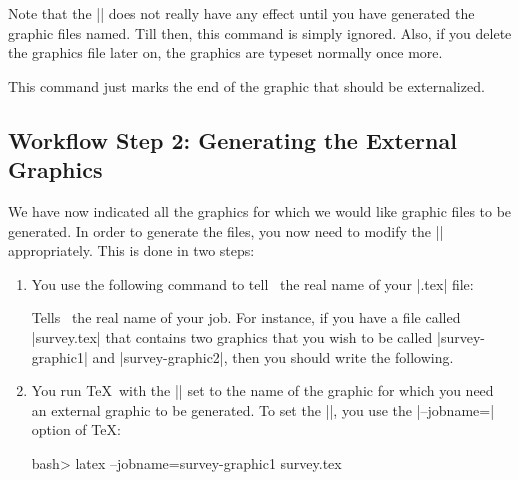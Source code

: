 \begin{command}{\beginpgfgraphicnamed{}}
  Note that the |\beginpgfgraphicnamed| does not really have any
  effect until you have generated the graphic files named. Till then,
  this command is simply ignored. Also, if you delete the graphics
  file later on, the graphics are typeset normally once more.
\end{command}

\begin{command}{\endpgfgraphicnamed}
  This command just marks the end of the graphic that should be
  externalized.
\end{command}


\subsection{Workflow Step 2: Generating the External Graphics}

We have now indicated all the graphics for which we would like graphic
files to be generated. In order to generate the files, you now need to
modify the |\jobname| appropriately. This is done in two steps:

\begin{enumerate}
\item You use the following command to tell \pgfname\ the real name of
  your |.tex| file:
  \begin{command}{\pgfrealjobname{}}
    Tells \pgfname\ the real name of your job. For instance, if you
    have a file called |survey.tex| that contains two graphics that
    you wish to be called |survey-graphic1| and |survey-graphic2|,
    then you should write the following.
  \end{command}
\item  You run \TeX\ with the |\jobname| set to the name of
the graphic for which you need an external graphic to be generated.
To set the |\jobname|, you use the |--jobname=| option of \TeX:

\begin{codeexample}[code only, tikz syntax=false]
bash> latex --jobname=survey-graphic1 survey.tex
\end{codeexample}
\end{enumerate}

